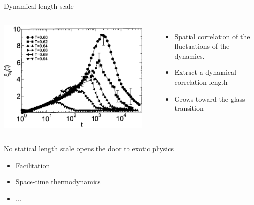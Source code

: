 \begin{frame}{Dynamical length scale}
	\begin{columns}
	\includegraphics[width=\columnwidth]{xi4_lacevic}\\
	\begin{footnotesize}\centering\citet{Lacevic2003}\end{footnotesize}
	\begin{itemize}
	\item Spatial correlation of the fluctuations of the dynamics.
	\item Extract a dynamical correlation length
	\item Grows toward the glass transition
	\end{itemize}
	\end{columns}
	\begin{center}
	No statical length scale opens the door to exotic physics	
	\begin{itemize}
		\item Facilitation
		\item Space-time thermodynamics
		\item $\dots$
	\end{itemize}
	\end{center}
\end{frame}

